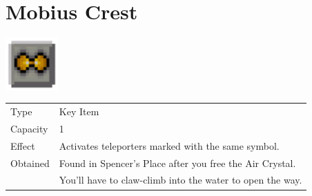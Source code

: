 \section{Mobius Crest}
\label{item:mobius_crest}

\includegraphics[height=2cm,keepaspectratio]{./resources/items/mobiuscrest}

\begin{longtable}{ l p{9cm} }
	Type
	& Key Item
\\ %
	Capacity
	& 1
\\ %
	Effect
	& Activates teleporters marked with the same symbol.
\\ %
	Obtained
	& Found in Spencer’s Place after you free the Air Crystal. \\
	& You’ll have to claw-climb into the water to open the way.
\end{longtable}
